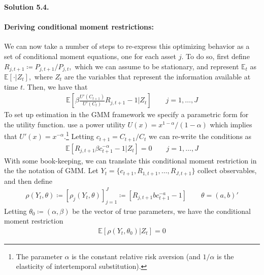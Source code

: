 \documentclass[11pt]{article}
\newenvironment{solution}[1]
    {\bigskip\noindent\textbf{Solution #1.} \par}
    {\medskip}
\newcommand{\ev}{\mathbb{E}}
\begin{document}
\begin{solution}{5.4}
\paragraph{Deriving conditional moment restrictions:} We can now take a number of steps to re-express this optimizing behavior as a set of conditional moment equations, one for each asset $j$. To do so, first define $R_{j,t+1} \coloneq P_{j,t+1} / P_{j,t},$ which we can assume to be stationary, and represent $\ev_t$ as $\ev[\cdot | Z_t],$ where $Z_t$ are the variables that represent the information available at time $t.$ Then, we have that 
\begin{align*}
    \ev\left[\beta\frac{U'(C_{t+1})}{U'(C_t)} R_{j,t+1}- 1\bigg| Z_t \right] \qquad j = 1, \ldots,J
\end{align*}
To set up estimation in the GMM framework we specify a parametric form for the utility function. \cite{hs1982gmm} use a power utility $U(x) = x^{1-\alpha}/(1-\alpha)$ which implies that $U'(x) = x^{-\alpha}.$\footnote{The parameter $\alpha$ is the constant relative risk aversion (and $1/\alpha$ is the elasticity of intertemporal substitution).} Letting $c_{t+1} = C_{t+1}/C_t$ we can re-write the conditions as 
\begin{align*}
    \ev\left[R_{j,t+1}\beta c_{t+1}^{-\alpha} - 1 | Z_t\right] = 0 \qquad j = 1, \ldots, J
\end{align*}
With some book-keeping, we can translate this conditional moment restriction in the the notation of GMM. Let $Y_t = \{c_{t+1}, R_{1, t+1}, \ldots, R_{J,t+1} \}$ collect observables, and then define
\begin{align*}
    \rho(Y_t, \theta) \coloneq \left[\rho_j(Y_t,\theta) \right]_{j=1}^J \coloneq \left[R_{j,t+1}bc_{t+1}^{-a} - 1 \right] \qquad \theta = (a,b)'
\end{align*}
Letting $\theta_0 \coloneq(\alpha,\beta)$ be the vector of true parameters, we have the conditional moment restriction
\begin{align*}
    \ev[\rho(Y_t,\theta_0) | Z_t] = 0
\end{align*}


\end{solution}
\end{document}
